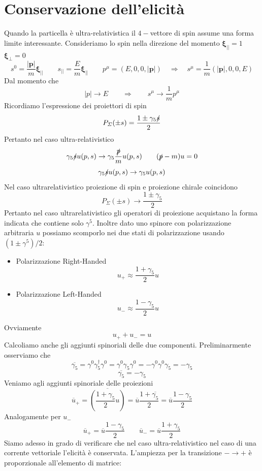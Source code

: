 \section{Conservazione dell'elicità}
Quando la particella è ultra-relativistica il $4-$vettore di spin assume una forma limite interessante. Consideriamo lo spin nella direzione del momento $\boldsymbol{\xi}_{||}=1$ $\boldsymbol{\xi}_{\perp}=0$
$$
s^0 = \frac{|\mathbf{p}|}{m} \boldsymbol{\xi}_{||} \qquad s_{||} = \frac{E}{m} \boldsymbol{\xi}_{||} \qquad p^\mu=(E,0,0,|\mathbf{p}|) \quad \Rightarrow \quad s^\mu=\frac{1}{m}(|\mathbf{p}|,0,0,E)
$$
Dal momento che 
$$
|p|\to E \qquad \Longrightarrow \qquad s^\mu\to\frac{1}{m}p^\mu
$$
Ricordiamo l'espressione dei proiettori di spin
$$
P_\Sigma(\pm s) = \frac{1 \pm \gamma_5 \slashed{s}}{2}
$$
Pertanto nel caso ultra-relativistico
$$
\gamma_5 \slashed{s} u(p,s) \to \gamma_5 \frac{\slashed{p}}{m} u(p,s) \qquad (\slashed{p} - m)u = 0
$$
$$
\gamma_5 \slashed{s} u(p,s) \to \gamma_5 u(p,s)
$$
Nel caso ultrarelativistico proiezione di spin e proiezione chirale coincidono
$$
P_\Sigma(\pm s) \to \frac{1 \pm \gamma_5}{2}
$$
Pertanto nel caso ultrarelativistico gli operatori di proiezione acquistano la forma indicata che contiene solo $\gamma^5$. Inoltre dato uno spinore con polarizzazione arbitraria $u$ possiamo scomporlo nei due stati di polarizzazione usando $(1\pm\gamma^5)/2$:
\begin{itemize}
    \item Polarizzazione Right-Handed 
    $$
u_+ \approx \frac{1 + \gamma_5}{2} u
$$
    \item Polarizzazione Left-Handed
    $$
u_- \approx \frac{1 - \gamma_5}{2} u
$$
\end{itemize}
Ovviamente
$$
u_+ + u_- = u
$$
Calcoliamo anche gli aggiunti spinoriali delle due componenti. Preliminarmente osserviamo che
$$
\overline{\gamma_5} = \gamma^0 \gamma_5^\dagger \gamma^0 = \gamma^0 \gamma_5 \gamma^0 = -\gamma^0 \gamma^0 \gamma_5 = -\gamma_5
$$
$$
\overline{\gamma_5} = -\gamma_5
$$
Veniamo agli aggiunti spinoriale delle proiezioni
$$
\overline{u}_+ = \overline{\left( \frac{1 + \gamma_5}{2} u \right)} = \overline{u} \frac{1 + \overline{\gamma_5}}{2} = \overline{u} \frac{1 - \gamma_5}{2}
$$
Analogamente per $u_-$
$$
\overline{u}_+ = \overline{u} \frac{1 - \gamma_5}{2} \qquad \overline{u}_- = \overline{u} \frac{1 + \gamma_5}{2}
$$
Siamo adesso in grado di verificare che nel caso ultra-relativistico nel caso di una corrente vettoriale l'elicità è conservata. L'ampiezza per la transizione $-\to +$ è proporzionale all'elemento di matrice:
